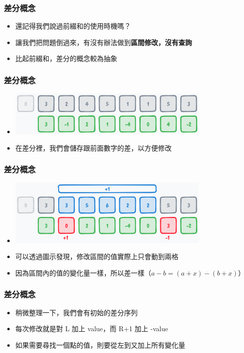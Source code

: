 \documentclass[mathserif]{beamer}
\begin{document}
\begin{frame}
    \frametitle{差分概念}
    \begin{itemize}
        \item 還記得我們說過前綴和的使用時機嗎？
        \item 讓我們把問題倒過來，有沒有辦法做到\textbf{區間修改，沒有查詢}
        \item 比起前綴和，差分的概念較為抽象
    \end{itemize}
\end{frame}

\begin{frame}
    \frametitle{差分概念}
    \begin{itemize}
        \item \includegraphics[width=10.0cm]{img/6-11.png}
        \item 在差分裡，我們會儲存跟前面數字的差，以方便修改
    \end{itemize}
\end{frame}

\begin{frame}
    \frametitle{差分概念}
    \begin{itemize}
        \item \includegraphics[width=10.0cm]{img/6-12.png}
        \item 可以透過圖示發現，修改區間的值實際上只會動到兩格
        \item 因為區間內的值的變化量一樣，所以差一樣（$a-b=(a+x)-(b+x)$）
    \end{itemize}
\end{frame}

\begin{frame}
    \frametitle{差分概念}
    \begin{itemize}
        \item 稍微整理一下，我們會有初始的差分序列
        \item 每次修改就是對 L 加上 value，而 R+1 加上 -value
        \item 如果需要尋找一個點的值，則要從左到又加上所有變化量
    \end{itemize}
\end{frame}
\end{document}
